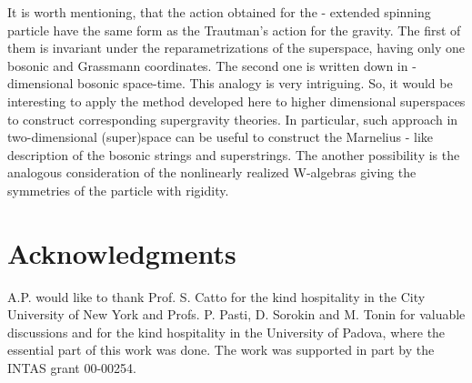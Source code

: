 \documentclass[a4paper,twocolumn,showpacs,preprintnumbers,amsmath,amssymb]{revtex4}
\begin{document}
It is worth mentioning, that the action obtained for the \coordHE{}- extended
spinning particle have the same form as the Trautman's\cite{T} action
for the gravity\cite{P_0}.  The first of them is invariant under the
reparametrizations of  the \coordHE{}
superspace, having only one bosonic and \coordHE{} Grassmann coordinates. The second one
is written down in \coordHE{}-dimensional bosonic space-time. This analogy is very intriguing.
So, it would be interesting to apply the method developed here
to  higher dimensional superspaces to construct corresponding
supergravity theories. In particular, such approach in two-dimensional
(super)space can be useful to construct the Marnelius - like description
of the bosonic strings and superstrings. The another possibility is the
analogous consideration of the nonlinearly realized W-algebras giving the
symmetries of the particle with rigidity.

\section*{Acknowledgments}
A.P. would like to thank Prof. S. Catto for the kind hospitality in the
City University of New York and Profs. P. Pasti, D. Sorokin and M. Tonin
for valuable discussions and for the kind hospitality in the
University of Padova, where the
essential part of this work was done.
The work  was supported in part by the
INTAS grant 00-00254.
\end{document}
